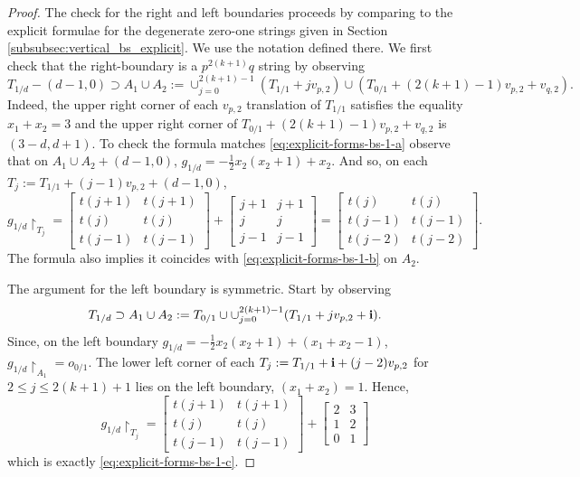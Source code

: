 \documentclass[12pt]{amsart}
\begin{document}
\begin{proof}
	The check for the right and left boundaries proceeds by comparing to the explicit formulae for the degenerate zero-one strings given in Section \ref{subsubsec:vertical_bs_explicit}. We use the notation defined there. We first check that the right-boundary is a $p^{2(k+1)}q$ string by observing
	\[
	T_{1/d} - (d-1,0) \supset A_1 \cup A_2 := \cup_{j=0}^{2(k+1)-1} (T_{1/1} + j v_{p,2}) \cup (T_{0/1} + (2(k+1)-1) v_{p,2} + v_{q,2}).
	\] 
	Indeed, the upper right corner of each $v_{p,2}$ translation of $T_{1/1}$ satisfies the equality $x_1 + x_2 = 3$ and the upper right corner
	of $T_{0/1} + (2(k+1)-1) v_{p,2} + v_{q,2}$ is $(3-d,d+1)$. To check the formula matches \eqref{eq:explicit-forms-bs-1-a}
	observe that on $A_1 \cup A_2 + (d-1,0)$, $g_{1/d} = -\frac{1}{2} x_2(x_2+1) + x_2$. And so, on each $T_j := T_{1/1} + (j-1) v_{p,2} + (d-1,0)$, 
	\[
	g_{1/d}\restriction_{T_j} =  
	\begin{bmatrix}
	t(j+1) & t(j+1) \\
	t(j) & t(j) \\
	t(j-1) & t(j-1) 
	\end{bmatrix}
	+
	\begin{bmatrix}
	j+1 & j+1 \\
	j  &  j  \\
	j-1 & j-1 	
	\end{bmatrix} 
	= 
	\begin{bmatrix}
	t(j) & t(j) \\
	t(j-1) & t(j-1) \\
	t(j-2) & t(j-2)
	\end{bmatrix}.
	\]	
	The formula also implies it coincides with \eqref{eq:explicit-forms-bs-1-b} on $A_2$. 
	
	The argument for the left boundary is symmetric. Start by observing 
	\[
	T_{1/d} \supset A_1 \cup A_2 := T_{0/1} \cup \cup_{j=0}^{2(k+1)-1} (T_{1/1} + j v_{p,2} + \mathbf{i}).
	\]
	Since, on the left boundary $g_{1/d} = -\frac{1}{2} x_2(x_2+1) + (x_1+x_2-1)$, $g_{1/d}\restriction_{A_1} = o_{0/1}$. 
	The lower left corner of each $T_j := T_{1/1} + \mathbf{i} + (j-2) v_{p,2}$ for $2 \leq j \leq 2(k+1)+1$ lies on the left boundary, $(x_1 + x_2) = 1$. 
	Hence, 
	\[
	g_{1/d}\restriction_{T_j} =  
	\begin{bmatrix}
	t(j+1) & t(j+1) \\
	t(j) & t(j) \\
	t(j-1) & t(j-1) 
	\end{bmatrix}
	+
	\begin{bmatrix}
	2 & 3 \\
	1  &  2  \\
	0 &  1 	
	\end{bmatrix} 
	\]
	which is exactly \eqref{eq:explicit-forms-bs-1-c}.
\end{proof}
\end{document}
